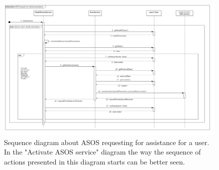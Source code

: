 \begin{figure}[h!]
	\includegraphics[width=1.0\textwidth]{./pictures/sequence_useAsos.png}\par
	\caption{Sequence diagram about ASOS requesting for assistance for a user. In the "Activate ASOS service" diagram the way the sequence of actions presented in this diagram starts can be better seen. }
\end{figure}
\FloatBarrier 
